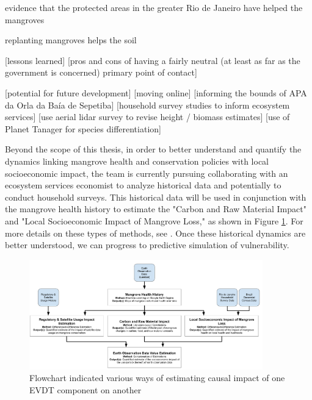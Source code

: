 evidence that the protected areas in the greater Rio de Janeiro have helped the mangroves \cite{cavalcantiEvaluatingMangroveConservation2009}

replanting mangroves helps the soil \cite{jimenezRecoverySoilProcesses2022}

[lessons learned]
	[pros and cons of having a fairly neutral (at least as far as the government is concerned) primary point of contact]
	
[potential for future development]
	[moving online]
	[informing the bounds of APA da Orla da Baía de Sepetiba]
	[household survey studies to inform ecosystem services]
	[use aerial lidar survey to revise height / biomass estimates]
	[use of Planet Tanager for species differentiation]

Beyond the scope of this thesis, in order to better understand and quantify the dynamics linking mangrove health and conservation policies with local socioeconomic impact, the team is currently pursuing collaborating with an ecosystem services economist to analyze historical data and potentially to conduct household surveys. This historical data will be used in conjunction with the mangrove health history to estimate the "Carbon and Raw Material Impact" and "Local Socioeconomic Impact of Mangrove Loss," as shown in Figure \ref{fig:method}. For more details on these types of methods, see \cite{jungBrazilNationalEnvironmental2017, jungPartnershipsPreventDeforestation2018}. Once these historical dynamics are better understood, we can progress to predictive simulation of vulnerability.




\begin{figure}[t] 
\centering
\includegraphics[width=0.9\textwidth]{Figures/chap4/Method_Flowchart.png}
\caption{Flowchart indicated various ways of estimating causal impact of one EVDT component on another}
\label{fig:method}
\end{figure}

